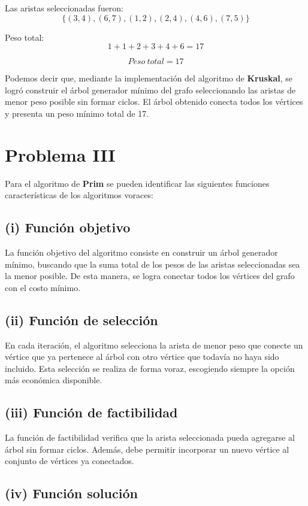 \documentclass[12pt]{article}
\begin{document}
	Las aristas seleccionadas fueron:
	\[\{(3,4),(6,7),(1,2),(2,4),(4,6),(7,5)\}\]
	
	Peso total:
	\[1+1+2+3+4+6 = 17\]
	
	\[\boxed{Peso\ total = 17}\]
	
	Podemos decir que, mediante la implementación del algoritmo de \textbf{Kruskal}, se logró construir el árbol generador mínimo del grafo seleccionando las aristas de menor peso posible sin formar ciclos. El árbol obtenido conecta todos los vértices y presenta un peso mínimo total de 17.
	

	\section*{Problema III}
	
	Para el algoritmo de \textbf{Prim} se pueden identificar las siguientes funciones características de los algoritmos voraces:
	
	\subsection*{(i) Función objetivo}
	
	La función objetivo del algoritmo consiste en construir un árbol generador mínimo, buscando que la suma total de los pesos de las aristas seleccionadas sea la menor posible. De esta manera, se logra conectar todos los vértices del grafo con el costo mínimo.
	
	\subsection*{(ii) Función de selección}
	
	En cada iteración, el algoritmo selecciona la arista de menor peso que conecte un vértice que ya pertenece al árbol con otro vértice que todavía no haya sido incluido. Esta selección se realiza de forma voraz, escogiendo siempre la opción más económica disponible.
	
	\subsection*{(iii) Función de factibilidad}
	
	La función de factibilidad verifica que la arista seleccionada pueda agregarse al árbol sin formar ciclos. Además, debe permitir incorporar un nuevo vértice al conjunto de vértices ya conectados.
	
	\subsection*{(iv) Función solución}
	
\end{document}

